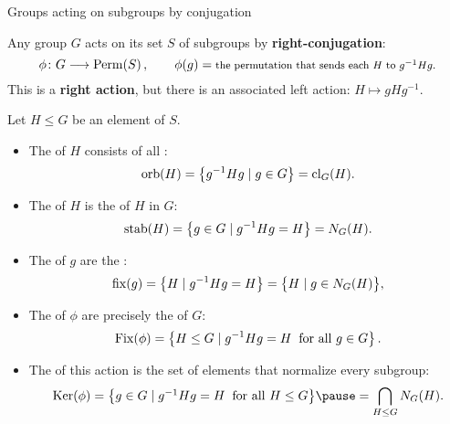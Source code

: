 \documentclass[8pt, handout]{beamer}
\newcommand{\Pause}{\pause}      %
\begin{document}

\begin{frame}{Groups acting on subgroups by conjugation} \smallskip
  
  Any group $G$ acts on its set $S$ of subgroups by
  \textbf{right-conjugation}:
  \[
  \phi\colon G\longrightarrow\operatorname{Perm}(S)\,,\qquad
  \phi(g)=\mbox{\footnotesize the permutation that sends each $H$ to
    $g^{-1}Hg$.}
  \]
  \Pause This is a \textbf{right action}, but there is an associated left
  action: $H\mapsto gHg^{-1}$.
  
  \medskip\Pause

  Let $H\leq G$ be an element of $S$. \smallskip\Pause
  \begin{itemize}
  \item The  of $H$ consists of all : %
    \[
    \operatorname{orb}(H)=\big\{g^{-1}Hg\mid g\in G\big\}=\operatorname{cl}_G(H).
    \]
    \vspace{-4mm}\Pause
  \item The  of $H$ is the
     of $H$ in $G$: 
    \[
    \operatorname{stab}(H)=\big\{g\in G\mid g^{-1}Hg=H\big\}=N_G(H).
    \]
    \vspace{-4mm}\Pause
  \item The  of $g$ are the
    :
    \[
    \operatorname{fix}(g)=\big\{H\mid g^{-1}Hg=H\big\}=\big\{H\mid g\in N_G(H)\big\},
    \]
    \vspace{-4mm}\Pause
  \item The  of $\phi$ are precisely the
     of $G$: %
    \[
    \operatorname{Fix}(\phi)=\big\{H\leq G\mid g^{-1}Hg=H\;\;\text{for all }g\in G\big\}\,.
    \]
    \vspace{-4mm}\Pause
  \item The  of this action is the set of elements that
    normalize every subgroup:
    \[
    \begin{array}{c@{\hspace{1mm}}c@{\hspace{1mm}}l}
      \Ker(\phi)
      &=&\big\{g\in G\mid g^{-1}Hg=H\;\;\text{for all }H\leq G\big\}
      \Pause=\displaystyle\bigcap_{H\leq G} N_G(H).
    \end{array}
    \]
  \end{itemize}
  
\end{frame}
\end{document}
